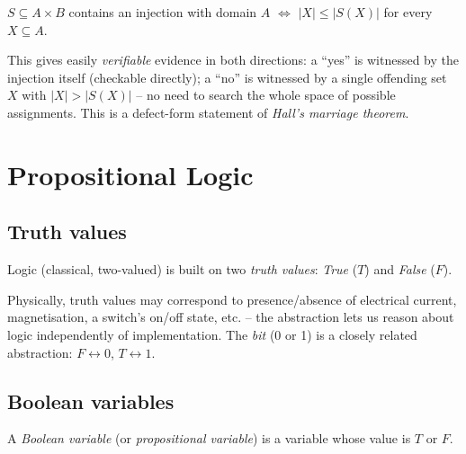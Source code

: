 \documentclass[11pt]{article}
\begin{document}
\bigskip
\begin{corollary}[CN Cor. 22]
$S \subseteq A\times B$ contains an injection with domain $A$ $\iff$ $|X|\le|S(X)|$ for every $X\subseteq A$.
\end{corollary}

\begin{note}
This gives easily \emph{verifiable} evidence in both directions: a ``yes'' is witnessed by the injection itself (checkable directly); a ``no'' is witnessed by a single offending set $X$ with $|X|>|S(X)|$ -- no need to search the whole space of possible assignments. This is a defect-form statement of \emph{Hall's marriage theorem}.
\end{note}

\newpage
\section{Propositional Logic}

\subsection{Truth values}
\label{sec:4-1}

\begin{definition}
Logic (classical, two-valued) is built on two \emph{truth values}: \emph{True} ($T$) and \emph{False} ($F$).
\end{definition}

\begin{note}
Physically, truth values may correspond to presence/absence of electrical current, magnetisation, a switch's on/off state, etc. -- the abstraction lets us reason about logic independently of implementation. The \emph{bit} (0 or 1) is a closely related abstraction: $F \leftrightarrow 0$, $T \leftrightarrow 1$.
\end{note}

\subsection{Boolean variables}
\label{sec:4-2}

\begin{definition}
A \emph{Boolean variable} (or \emph{propositional variable}) is a variable whose value is $T$ or $F$.
\end{definition}
\end{document}
